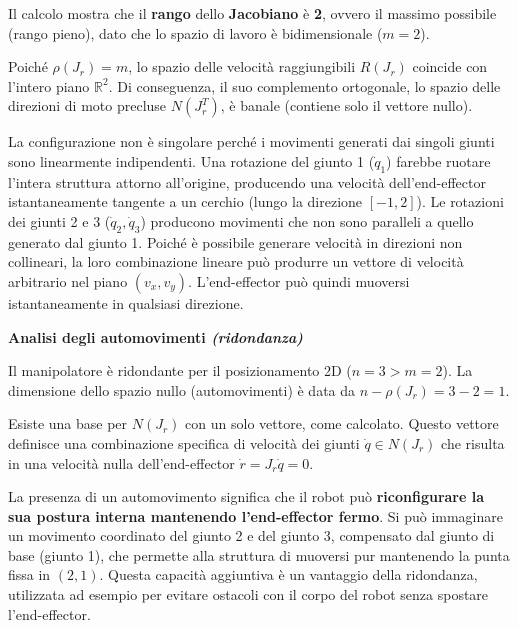 \documentclass[11pt, a4paper]{article}
\begin{document}
\begin{par}
\begin{flushleft}
Il calcolo mostra che il \textbf{rango} dello \textbf{Jacobiano} è \textbf{2}, ovvero il massimo possibile (rango pieno), dato che lo spazio di lavoro è bidimensionale ($m=2$).

Poiché $\rho(J_r)=m$, lo spazio delle velocità raggiungibili $R(J_r)$ coincide con l'intero piano $\mathbb{R}^2$. Di conseguenza, il suo complemento ortogonale, lo spazio delle direzioni di moto precluse $N(J_r^T)$, è banale (contiene solo il vettore nullo).

La configurazione non è singolare perché i movimenti generati dai singoli giunti sono linearmente indipendenti. Una rotazione del giunto 1 ($\dot{q}_1$) farebbe ruotare l'intera struttura attorno all'origine, producendo una velocità dell'end-effector istantaneamente tangente a un cerchio (lungo la direzione $[-1,2]$). Le rotazioni dei giunti 2 e 3 ($\dot{q}_2, \dot{q}_3$) producono movimenti che non sono paralleli a quello generato dal giunto 1. Poiché è possibile generare velocità in direzioni non collineari, la loro combinazione lineare può produrre un vettore di velocità arbitrario nel piano $(v_x, v_y)$. L'end-effector può quindi muoversi istantaneamente in qualsiasi direzione.
\end{flushleft}
\end{par}
\newpage
\begin{par}
\begin{flushleft}
\textbf{Analisi degli automovimenti \textit{(ridondanza)}}
\end{flushleft}
\end{par}

\begin{par}
\begin{flushleft}
Il manipolatore è ridondante per il posizionamento 2D ($n=3>m=2$). La dimensione dello spazio nullo (automovimenti) è data da
$n - \rho(J_r) = 3 - 2 = 1$.

Esiste una base per $N(J_r)$ con un solo vettore, come calcolato. Questo vettore definisce una combinazione specifica di velocità dei giunti $\dot{q} \in N(J_r)$ che risulta in una velocità nulla dell'end-effector $\dot{r} = J_r \dot{q} = 0$.

La presenza di un automovimento significa che il robot può \textbf{riconfigurare la sua postura interna mantenendo l'end-effector fermo}. Si può immaginare un movimento coordinato del giunto 2 e del giunto 3, compensato dal giunto di base (giunto 1), che permette alla struttura di muoversi pur mantenendo la punta fissa in $(2,1)$. Questa capacità aggiuntiva è un vantaggio della ridondanza, utilizzata ad esempio per evitare ostacoli con il corpo del robot senza spostare l'end-effector.
\end{flushleft}
\end{par}
\end{document}
